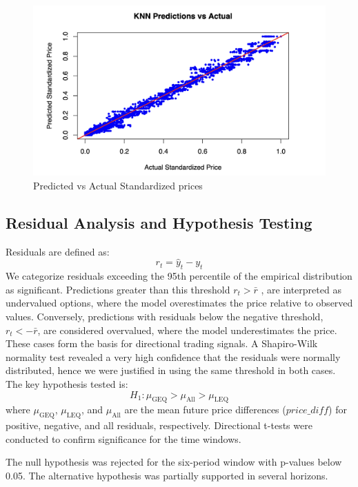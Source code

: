 \documentclass{article}
\begin{document}
\begin{figure}[h]
  \centering
  \includegraphics[width=0.8\linewidth]{data/results/knn_preds.png}
  \caption{Predicted vs Actual Standardized prices}
  \label{fig:knn-preds}
\end{figure}

\subsection{Residual Analysis and Hypothesis Testing}

Residuals are defined as:
\[
r_t = \hat{y}_t - y_t
\]
We categorize residuals exceeding the 95th percentile of the empirical distribution as significant. Predictions greater than this threshold $r_t > \bar{r}$ , are interpreted as undervalued options, where the model overestimates the price relative to observed values. Conversely, predictions with residuals below the negative threshold, $r_t < -\bar{r}$, are considered overvalued, where the model underestimates the price. These cases form the basis for directional trading signals. A Shapiro-Wilk normality test revealed a very high confidence that the residuals were normally distributed, hence we were justified in using the same threshold in both cases.
The key hypothesis tested is:
\[
H_1: \mu_{\text{GEQ}} > \mu_{\text{All}} > \mu_{\text{LEQ}}
\]
where \( \mu_{\text{GEQ}} \), \( \mu_{\text{LEQ}} \), and \( \mu_{\text{All}} \) are the mean future price differences ($price\_diff$) for positive, negative, and all residuals, respectively. Directional t-tests were conducted to confirm significance for the time windows.

The null hypothesis was rejected for the six-period window with p-values below 0.05. The alternative hypothesis was partially supported in several horizons.
\end{document}
